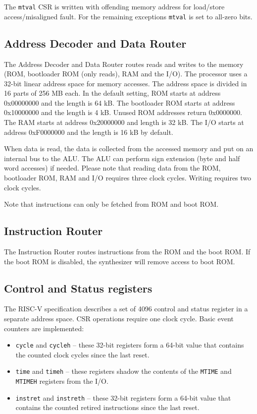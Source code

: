 \documentclass[12pt]{article}
\begin{document}
The \lstinline|mtval| CSR is written with offending memory address for load/store access/misaligned fault. For the remaining exceptions \lstinline|mtval| is set to all-zero bits.

\subsection{Address Decoder and Data Router}
\label{sec:addressdecoderanddatarouter}
The Address Decoder and Data Router routes reads and writes to the memory (ROM, bootloader ROM (only reads), RAM and the I/O). The processor uses a 32-bit linear address space for memory accesses. The address space is divided in 16 parts of 256 MB each. In the default setting, ROM starts at address 0x00000000 and the length is 64 kB. The bootloader ROM starts at address 0x10000000 and the length is 4 kB. Unused ROM addresses return 0x0000000. The RAM starts at address 0x20000000 and length is 32 kB. The I/O starts at address 0xF0000000 and the length is 16 kB by default.

When data is read, the data is collected from the accessed memory and put on an internal bus to the ALU. The ALU can perform sign extension (byte and half word accesses) if needed. Please note that reading data from the ROM, bootloader ROM, RAM and I/O requires three clock cycles. Writing requires two clock cycles.

Note that instructions can only be fetched from ROM and boot ROM.

\subsection{Instruction Router}
The Instruction Router routes instructions from the ROM and the boot ROM. If the boot ROM is disabled, the synthesizer will remove access to boot ROM.

\subsection{Control and Status registers}
The RISC-V specification describes a set of 4096 control and status register in a separate address space. CSR operations require one clock cycle. Basic event counters are implemented:

\begin{itemize}
\item \lstinline|cycle| and \lstinline|cycleh| -- these 32-bit registers form a 64-bit value that contains the counted clock cycles since the last reset.
\item \lstinline|time| and \lstinline|timeh| -- these registers shadow the contents of the \lstinline|MTIME| and \lstinline|MTIMEH| registers from the I/O.
\item \lstinline|instret| and \lstinline|instreth| -- these 32-bit registers form a 64-bit value that contains the counted retired instructions since the last reset.
\end{itemize}
\end{document}
